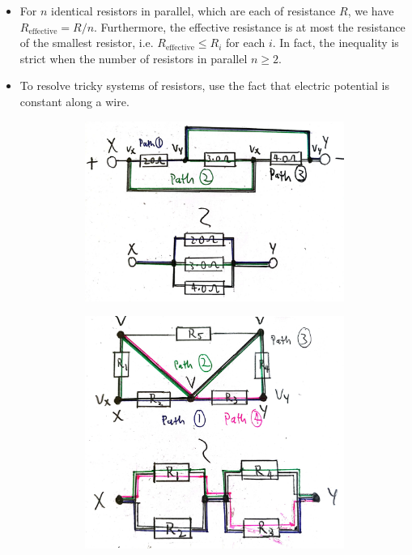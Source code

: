 \begin{itemize}
    \item For \(n\) identical resistors in parallel, which are each of resistance \(R\), we have \(R_{\text{effective}}=R/n\). Furthermore, the effective resistance is at most the resistance of the smallest resistor, i.e. \(R_{\text{effective}}\leq R_i\) for each \(i\). In fact, the inequality is strict when the number of resistors in parallel \(n\geq 2\).
    \item To resolve tricky systems of resistors, use the fact that electric potential is constant along a wire.
    \begin{figure}[H]
        \centering
        \begin{subfigure}{0.45\textwidth}
            \centering
            \includegraphics[width=\textwidth]{../images/DC-Circuits-Resistors.jpg}
            \caption{}
            \label{}
        \end{subfigure}\hfill
        \begin{subfigure}{0.45\textwidth}
            \centering
            \includegraphics[width=\textwidth]{../images/DC-Circuits-Resistors2.jpg}

\end{subfigure}
\end{figure}
\end{itemize}
